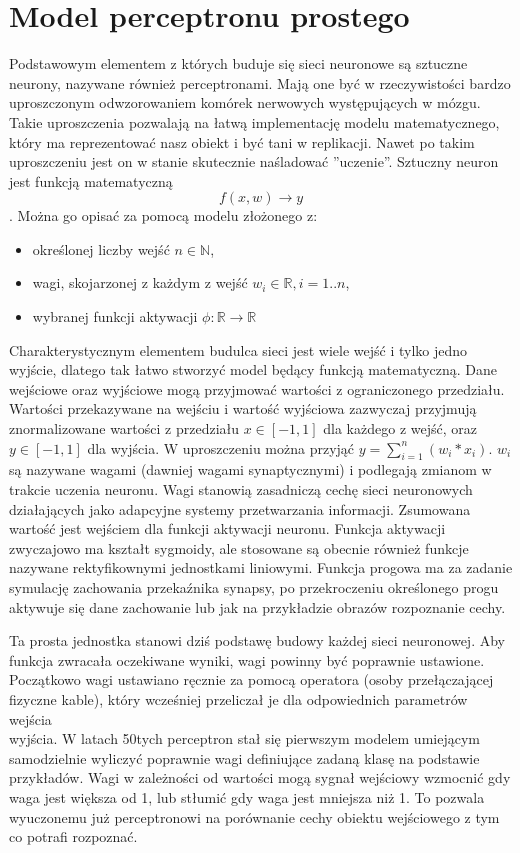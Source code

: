 \documentclass[12pt,a4paper,twoside,titlepage,openright]{book}
\begin{document}
\section{Model perceptronu prostego}
Podstawowym elementem z których buduje się sieci neuronowe są sztuczne neurony, nazywane również perceptronami. Mają one być w rzeczywistości bardzo uproszczonym odwzorowaniem komórek nerwowych występujących w mózgu. Takie uproszczenia pozwalają na łatwą implementację modelu matematycznego, który ma reprezentować nasz obiekt i być tani w replikacji. Nawet po takim uproszczeniu jest on w stanie skutecznie naśladować ''uczenie''.
Sztuczny neuron jest funkcją matematyczną $$f(x,w) \to y$$. Można go opisać za pomocą modelu złożonego z:
\begin{itemize}
\item określonej liczby wejść \(n \in \mathbb{N}\),
\item wagi, skojarzonej z każdym z wejść \(w_i \in \mathbb{R}, i=1..n\),
\item wybranej funkcji aktywacji \(\phi: \mathbb{R} \to \mathbb{R} \)
\end{itemize}

Charakterystycznym elementem budulca sieci jest wiele wejść i tylko jedno wyjście, dlatego tak łatwo stworzyć model będący funkcją matematyczną.
Dane wejściowe oraz wyjściowe mogą przyjmować wartości z ograniczonego przedziału. Wartości przekazywane na wejściu i wartość wyjściowa zazwyczaj przyjmują znormalizowane wartości z przedziału \(x \in [-1, 1]\) dla każdego z wejść, oraz \(y \in [-1,1]\) dla wyjścia. W uproszczeniu można przyjąć \(y = \sum\limits_{i=1}^n (w_i * x_i)\). \(w_i\) są nazywane wagami (dawniej wagami synaptycznymi) i podlegają zmianom w trakcie uczenia neuronu. Wagi stanowią zasadniczą cechę sieci neuronowych działających jako adapcyjne systemy przetwarzania informacji. Zsumowana wartość jest wejściem dla funkcji aktywacji neuronu. Funkcja aktywacji zwyczajowo ma kształt sygmoidy, ale stosowane są obecnie również funkcje nazywane rektyfikownymi jednostkami liniowymi. Funkcja progowa ma za zadanie symulację zachowania przekaźnika synapsy, po przekroczeniu określonego progu aktywuje się dane zachowanie lub jak na przykładzie obrazów rozpoznanie cechy.

Ta prosta jednostka stanowi dziś podstawę budowy każdej sieci neuronowej. Aby funkcja zwracała oczekiwane wyniki, wagi powinny być poprawnie ustawione. Początkowo wagi ustawiano ręcznie za pomocą operatora (osoby przełączającej fizyczne kable), który wcześniej przeliczał je dla odpowiednich parametrów wejścia\\wyjścia. W latach 50tych perceptron stał się pierwszym modelem umiejącym samodzielnie wyliczyć poprawnie wagi definiujące zadaną klasę na podstawie przykładów. Wagi w zależności od wartości mogą sygnał wejściowy wzmocnić gdy waga jest większa od 1, lub stłumić gdy waga jest mniejsza niż 1. To pozwala wyuczonemu już perceptronowi na porównanie cechy obiektu wejściowego z tym co potrafi rozpoznać. 
\end{document}
